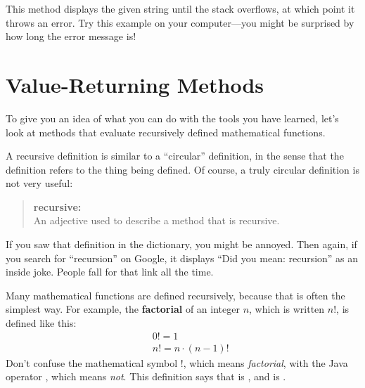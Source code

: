 
This method displays the given string until the stack overflows, at which point it throws an error.
Try this example on your computer---you might be surprised by how long the error message is!


\section{Value-Returning Methods}
\label{factorial}

%
%

To give you an idea of what you can do with the tools you have learned, let's look at methods that evaluate recursively defined mathematical functions.

A recursive definition is similar to a ``circular'' definition, in the sense that the definition refers to the thing being defined.
Of course, a truly circular definition is not very useful:

\begin{quote}
{\bf recursive:} \\
An adjective used to describe a method that is recursive.
\end{quote}


If you saw that definition in the dictionary, you might be annoyed.
Then again, if you search for ``recursion'' on Google, it displays ``Did you mean: recursion'' as an inside joke.
People fall for that link all the time.


Many mathematical functions are defined recursively, because that is often the simplest way.
For example, the {\bf factorial} of an integer $n$, which is written $n!$, is defined like this:
%
\begin{eqnarray*}
&&  0! = 1 \\
&&  n! = n \cdot(n-1)!
\end{eqnarray*}
%
Don't confuse the mathematical symbol $!$, which means {\em factorial}, with the Java operator \java{!}, which means {\em not}.
This definition says that  is , and  is .

